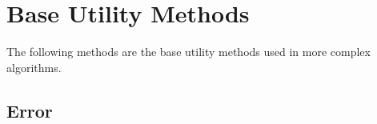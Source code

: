 
\section{\bf Base Utility Methods}

The following methods are the base utility methods used in more complex algorithms.

\subsection{Error}

\newpage
